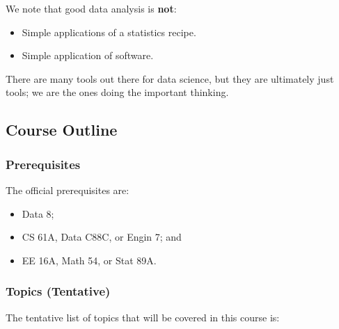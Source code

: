 \documentclass[openany]{book}
\begin{document}
We note that good data analysis is \textbf{not}:
\begin{itemize}
	\item Simple applications of a statistics recipe.
	\item Simple application of software.
\end{itemize}

There are many tools out there for data science, but they are ultimately just tools; we are the ones doing the important thinking.

\subsection{Course Outline}
\subsubsection{Prerequisites}
The official prerequisites are:
\begin{itemize}
	\item Data 8;
	\item CS 61A, Data C88C, or Engin 7; and
	\item EE 16A, Math 54, or Stat 89A.
\end{itemize}

\subsubsection{Topics (Tentative)}
The tentative list of topics that will be covered in this course is:
\end{document}
